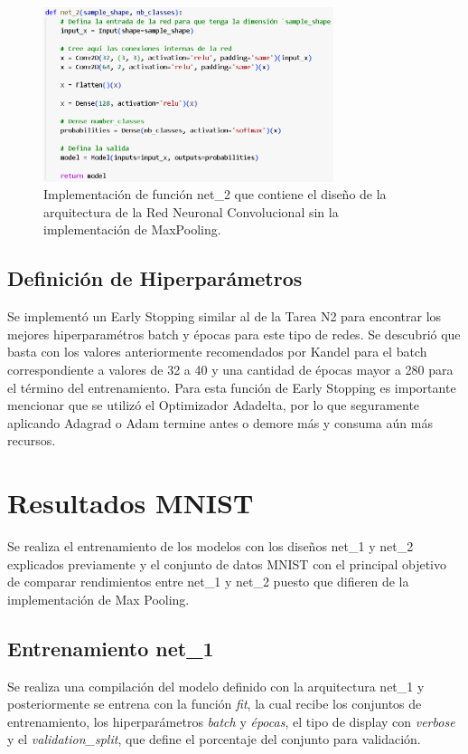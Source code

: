 \documentclass[journal]{IEEEtai}
\begin{document}
\begin{figure}[h!]
\centering
\includegraphics[width=8.5cm]{img/codenet2.png}
\caption{Implementación de función net\_2 que contiene el diseño de la arquitectura de la Red Neuronal Convolucional sin la implementación de MaxPooling.}
\label{fig: codenet2}
\end{figure}

\subsection{Definición de Hiperparámetros}

Se implementó un Early Stopping similar al de la Tarea N2 \cite{Epocas} para encontrar los mejores hiperparamétros batch y épocas para este tipo de redes. Se descubrió que basta con los valores anteriormente recomendados por Kandel \cite{BatchSize} para el batch correspondiente a valores de 32 a 40 y una cantidad de épocas mayor a 280 para el término del entrenamiento. Para esta función de Early Stopping es importante mencionar que se utilizó el Optimizador Adadelta, por lo que seguramente aplicando Adagrad o Adam termine antes o demore más y consuma aún más recursos.

\section{Resultados MNIST}

Se realiza el entrenamiento de los modelos con los diseños net\_1 y net\_2 explicados previamente y el conjunto de datos MNIST con el principal objetivo de comparar rendimientos entre net\_1 y net\_2 puesto que difieren de la implementación de Max Pooling.
\hfill\break
\subsection{Entrenamiento net\_1}

Se realiza una compilación del modelo definido con la arquitectura net\_1 y posteriormente se entrena con la función \textit{fit}, la cual recibe los conjuntos de entrenamiento, los hiperparámetros \textit{batch} y \textit{épocas}, el tipo de display con \textit{verbose} y el \textit{validation\_split}, que define el porcentaje del conjunto para validación.
\end{document}
